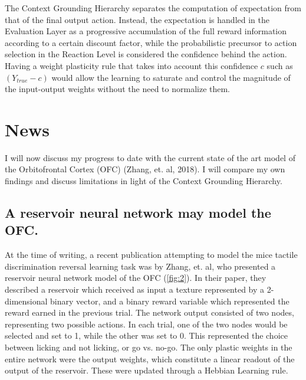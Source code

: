 \documentclass[11pt]{article}
\begin{document}
The Context Grounding Hierarchy separates the computation of expectation from that of the final output action.  Instead, the expectation is handled in the Evaluation Layer as a progressive accumulation of the full reward information according to a certain discount factor, while the probabilistic precursor to action selection in the Reaction Level is considered the confidence behind the action.  Having a weight plasticity rule that takes into account this confidence $c$ such as $(Y_{true} - c)$ would allow the learning to saturate and control the magnitude of the input-output weights without the need to normalize them.

\section{News}
I will now discuss my progress to date with the current state of the art model of the Orbitofrontal Cortex (OFC) (Zhang, et. al, 2018).  I will compare my own findings and discuss limitations in light of the Context Grounding Hierarchy.

\subsection{A reservoir neural network may model the OFC.}
At the time of writing, a recent publication attempting to model the mice tactile discrimination reversal learning task was by Zhang, et. al, who presented a reservoir neural network model of the OFC (\autoref{fig:2}).  In their paper, they described a reservoir which received as input a texture represented by a 2-dimensional binary vector, and a binary reward variable which represented the reward earned in the previous trial.  The network output consisted of two nodes, representing two possible actions.  In each trial, one of the two nodes would be selected and set to 1, while the other was set to 0.  This represented the choice between licking and not licking, or go vs. no-go.  The only plastic weights in the entire network were the output weights, which constitute a linear readout of the output of the reservoir.  These were updated through a Hebbian Learning rule.
\end{document}
